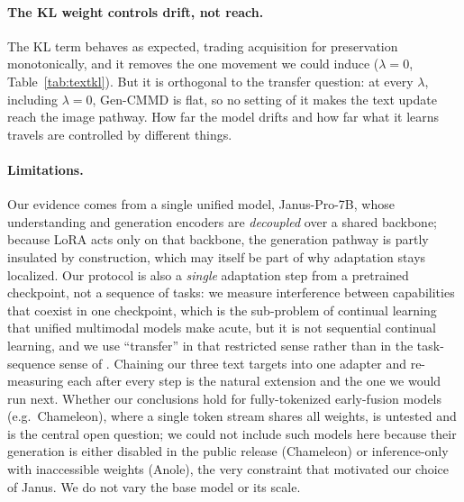 \documentclass{article}
\begin{document}
\paragraph{The KL weight controls drift, not reach.}
The KL term behaves as expected, trading acquisition for preservation
monotonically, and it removes the one movement we could induce ($\lambda=0$,
Table~\ref{tab:textkl}). But it is orthogonal to the transfer question: at every
$\lambda$, including $\lambda=0$, Gen-CMMD is flat, so no setting of it makes the
text update reach the image pathway. How far the model drifts and how far what it
learns travels are controlled by different things.

\paragraph{Limitations.}
Our evidence comes from a single unified model, Janus-Pro-7B, whose
understanding and generation encoders are \emph{decoupled} over a shared
backbone; because LoRA acts only on that backbone, the generation pathway is
partly insulated by construction, which may itself be part of why adaptation
stays localized. Our protocol is also a \emph{single} adaptation step from a
pretrained checkpoint, not a sequence of tasks: we measure interference between
capabilities that coexist in one checkpoint, which is the sub-problem of
continual learning that unified multimodal models make acute, but it is not
sequential continual learning, and we use ``transfer'' in that restricted sense
rather than in the task-sequence sense of \citet{lopezpaz2017gem}. Chaining our
three text targets into one adapter and re-measuring each after every step is the
natural extension and the one we would run next. Whether our conclusions hold for
fully-tokenized early-fusion models (e.g.\ Chameleon), where a single token
stream shares all weights, is untested and is the central open question; we could
not include such models here because their generation is either disabled in the
public release (Chameleon) or inference-only with inaccessible weights (Anole),
the very constraint that motivated our choice of Janus. We do not vary the base
model or its scale.
\end{document}
